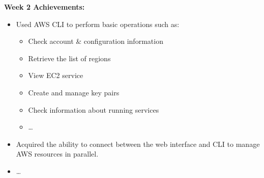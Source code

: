 \vspace{0.5em}\noindent\textbf{Week 2 Achievements:}\par

\begin{itemize}
\item
  Used AWS CLI to perform basic operations such as:

  \begin{itemize}
  \tightlist
  \item
    Check account \& configuration information
  \item
    Retrieve the list of regions
  \item
    View EC2 service
  \item
    Create and manage key pairs
  \item
    Check information about running services
  \item
    \ldots{}
  \end{itemize}
\item
  Acquired the ability to connect between the web interface and CLI to
  manage AWS resources in parallel.
\item
  \ldots{}
\end{itemize}
